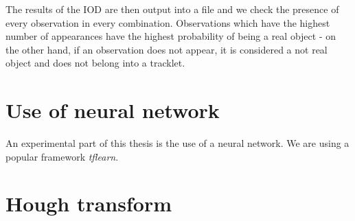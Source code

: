 	 The results of the IOD are then output into a file and we check the presence of every observation in every combination. Observations which have the highest number of appearances have the highest probability of being a real object - on the other hand, if an observation does not appear, it is considered a not real object and does not belong into a tracklet.

\section{Use of neural network}\label{sec:neural}

	An experimental part of this thesis is the use of a neural network. We are using a popular framework \emph{tflearn}.

\section{Hough transform}\label{sec:hough}

	